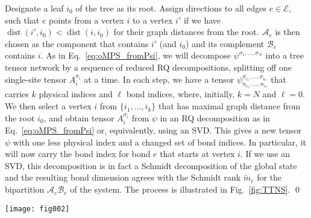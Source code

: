 \documentclass[english,11pt,aps,pra,onecolumn,tightenlines,groupedaddress,superscriptaddress,notitlepage,floatfix,fleqn]{revtex4-1}
\newcommand{\ket}{\rangle}
\newcommand{\dist}{\operatorname{dist}}
\newcommand{\s}{\sigma}
\newcommand{\mc}[1]{\mathcal{#1}}
\newcommand{\A}{\mc{A}}
\newcommand{\B}{\mc{B}}
\newcommand{\E}{\mc{E}}
\begin{document}
Designate a leaf $i_0$ of the tree as its root. Assign directions to all edges $e\in \E$, such that $e$ points from a vertex $i$ to a vertex $i'$ if we have $\dist(i',i_0)<\dist(i,i_0)$ for their graph distances from the root. $\A_e$ is then chosen as the component that contains $i'$ (and $i_0$) and its complement $\B_e$ contains $i$.
As in Eq.~\eqref{eq:oMPS_fromPsi}, we will decompose $\psi^{\s_1,\dotsc,\s_N}$ into a tree tensor network by a sequence of reduced RQ decompositions, splitting off one single-site tensor $A^{\s_i}_i$ at a time. In each step, we have a tensor $\psi^{\s_{i_1},\dotsc,\s_{i_k}}_{n_{e_1},\dotsc,n_{e_\ell}}$ that carries $k$  physical indices and $\ell$ bond indices, where,  initially, $k=N$ and $\ell=0$. We then select a vertex $i$ from $\{i_1,\dotsc,i_k\}$ that has maximal graph distance from the root $i_0$, and obtain tensor $A_i^{\s_i}$ from $\psi$ in an RQ decomposition as in Eq.~\eqref{eq:oMPS_fromPsi} or, equivalently, using an SVD. This gives a new tensor $\psi$ with one less physical index and a changed set of bond indices. In particular, it will now carry the bond index for bond $e$ that starts at vertex $i$. If we use an SVD, this decomposition is in fact a Schmidt decomposition of the global state and the resulting bond dimension agrees with the Schmidt rank $\tilde{m}_e$ for the bipartition $\A_e\B_e$ of the system. The process is illustrated in Fig.~\ref{fig:TTNS}. \qed
\begin{figure*}[t]
\label{fig:TTNS}
\texttt{[image: fig002]}
\caption{Decomposition of a state $|\psi\ket$ into a TTNS for a system with $N=14$ sites as discussed in Sec.~\ref{sec:TTNS}. Site $i_0=1$ is chosen as the root and edges directed accordingly. One then splits off TTNS tensors sequentially using RQ decompositions, starting from the site with the largest distance from $i_0$. The resulting bond dimensions agree with the Schmidt ranks of the state $|\psi\ket$.}
\end{figure*}
\end{document}
